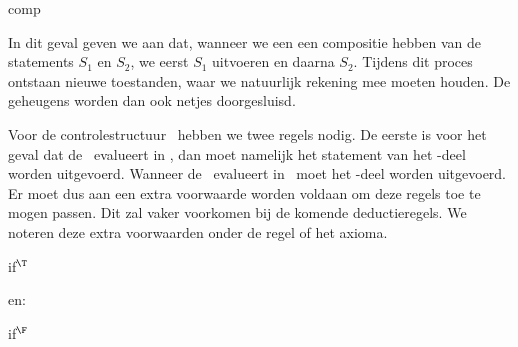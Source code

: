 \begin{NSAxiom}{comp}
  \begin{prooftree}
  \end{prooftree}
\end{NSAxiom}

In dit geval geven we aan dat, wanneer we een een compositie hebben van de statements $S_1$ en $S_2$, we eerst $S_1$ uitvoeren%
en daarna $S_2$. Tijdens dit proces ontstaan nieuwe toestanden, waar we natuurlijk rekening mee moeten houden. De geheugens worden dan ook netjes doorgesluisd.

Voor de controlestructuur \IF\ hebben we twee regels nodig. De eerste is voor het geval dat de \BExpr\ evalueert in \T, dan moet namelijk het statement van het \THEN-deel worden uitgevoerd. Wanneer de \BExpr\ evalueert in \F\ moet het \ELSE-deel worden uitgevoerd.
Er moet dus aan een extra voorwaarde worden voldaan om deze regels toe te mogen passen. Dit zal vaker voorkomen bij de komende deductieregels. We noteren deze extra voorwaarden onder de regel of het axioma.

\begin{NSAxiom}{if$^\T$}
  \begin{prooftree}
  \end{prooftree}
  \begin{NSConditions}
  \end{NSConditions}
\end{NSAxiom}

en:

\begin{NSAxiom}{if$^\F$}
  \begin{prooftree}
  \end{prooftree}
  \begin{NSConditions}
  \end{NSConditions}
\end{NSAxiom}

